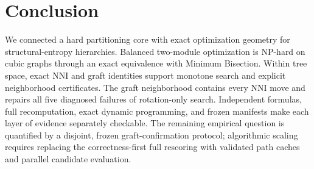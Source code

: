 \section{Conclusion}\label{sec:conclusion}

We connected a hard partitioning core with exact optimization geometry for
structural-entropy hierarchies. Balanced two-module optimization is NP-hard on
cubic graphs through an exact equivalence with Minimum Bisection. Within tree
space, exact NNI and graft identities support monotone search and explicit
neighborhood certificates. The graft neighborhood contains every NNI move and
repairs all five diagnosed failures of rotation-only search. Independent
formulas, full recomputation, exact dynamic programming, and frozen manifests
make each layer of evidence separately checkable. The remaining empirical
question is quantified by a disjoint, frozen graft-confirmation protocol;
algorithmic scaling requires replacing the correctness-first full rescoring
with validated path caches and parallel candidate evaluation.
